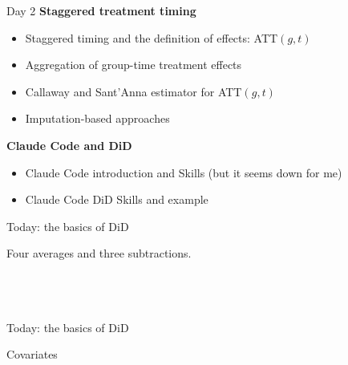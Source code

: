 \documentclass[aspectratio=169,11pt]{beamer}
\begin{document}
\begin{frame}{Day 2}
\vspace{0.6em}
{\large{} \quad\textbf{Staggered treatment timing}}
\begin{itemize}\setlength{\itemsep}{0.15em}\small
  \item Staggered timing and the definition of effects: ATT$(g,t)$
  \item Aggregation of group-time treatment effects
  \item Callaway and Sant'Anna estimator for ATT$(g,t)$
  \item Imputation-based approaches
\end{itemize}
\vspace{0.5em}
{\large{} \quad\textbf{Claude Code and DiD}}
\begin{itemize}\setlength{\itemsep}{0.15em}\small
  \item Claude Code introduction and Skills (but it seems down for me)
  \item Claude Code DiD Skills and example
\end{itemize}
\end{frame}

\begin{frame}{Today: the basics of DiD}
\vspace{1.4em}
\begin{center}
{\Large Four averages and three subtractions.}\\[1.8em]
{\large {}}\\[0.5em]
{\large {}}\\[0.5em]
{\large {}}\\[0.5em]
{\large {}}
\end{center}
\end{frame}

\begin{frame}{Today: the basics of DiD}
\vspace{1.4em}
\begin{center}
{\Large Covariates}\\[1.8em]
{\large {}}\\[0.5em]
{\large {}}\\[0.5em]
{\large {}}\\[0.5em]
{\large {}}
\end{center}
\end{frame}
\end{document}
